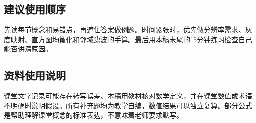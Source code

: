 \subsection*{建议使用顺序}
先读每节概念和易错点，再遮住答案做例题。时间紧张时，优先做分辨率需求、灰度映射、直方图均衡化和邻域滤波的手算。最后用本稿末尾的15分钟练习检查自己能否讲清原因。
\subsection*{资料使用说明}
课堂文字记录可能存在转写误差。本稿用教材核对数学定义，并在课堂数值或术语不明确时说明假设。所有补充题均为教学自编，数值结果可以独立复算。部分公式是帮助理解课堂概念的标准表达，不意味着老师要求默写。
\clearpage
\tableofcontents
\clearpage

